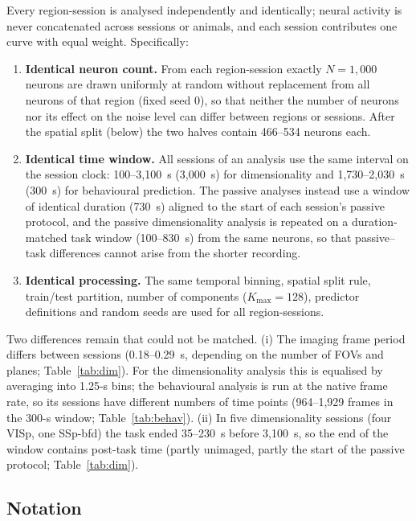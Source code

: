 \documentclass[11pt]{article}
\begin{document}
Every region-session is analysed independently and identically; neural activity is never concatenated across sessions or animals, and each session contributes one curve with equal weight. Specifically:
\begin{enumerate}
  \item \textbf{Identical neuron count.} From each region-session exactly $N = 1{,}000$ neurons are drawn uniformly at random without replacement from all neurons of that region (fixed seed 0), so that neither the number of neurons nor its effect on the noise level can differ between regions or sessions. After the spatial split (below) the two halves contain 466--534 neurons each.
  \item \textbf{Identical time window.} All sessions of an analysis use the same interval on the session clock: 100--3,100~s (3,000~s) for dimensionality and 1,730--2,030~s (300~s) for behavioural prediction. The passive analyses instead use a window of identical duration (730~s) aligned to the start of each session's passive protocol, and the passive dimensionality analysis is repeated on a duration-matched task window (100--830~s) from the same neurons, so that passive--task differences cannot arise from the shorter recording.
  \item \textbf{Identical processing.} The same temporal binning, spatial split rule, train/test partition, number of components ($K_{\max}=128$), predictor definitions and random seeds are used for all region-sessions.
\end{enumerate}
Two differences remain that could not be matched. (i) The imaging frame period differs between sessions (0.18--0.29~s, depending on the number of FOVs and planes; Table~\ref{tab:dim}). For the dimensionality analysis this is equalised by averaging into 1.25-s bins; the behavioural analysis is run at the native frame rate, so its sessions have different numbers of time points (964--1,929 frames in the 300-s window; Table~\ref{tab:behav}). (ii) In five dimensionality sessions (four VISp, one SSp-bfd) the task ended 35--230~s before 3,100~s, so the end of the window contains post-task time (partly unimaged, partly the start of the passive protocol; Table~\ref{tab:dim}).

\subsection{Notation}
\end{document}
